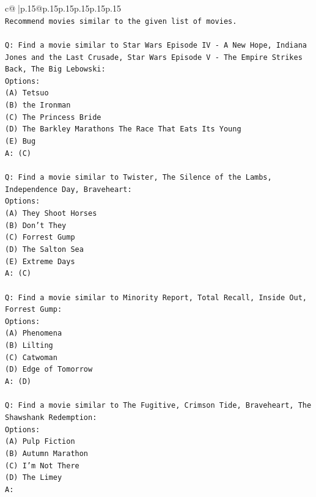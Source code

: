 \documentclass{article}
\begin{document}
{\begin{supertabular}{c@{$\;$}|p{.15\linewidth}@{}p{.15\linewidth}p{.15\linewidth}p{.15\linewidth}p{.15\linewidth}p{.15\linewidth}}
{{{\\ 
\texttt{Recommend movies similar to the given list of movies.} \\
\\ 
\texttt{Q: Find a movie similar to Star Wars Episode IV {-} A New Hope, Indiana Jones and the Last Crusade, Star Wars Episode V {-} The Empire Strikes Back, The Big Lebowski:} \\
\texttt{Options:} \\
\texttt{(A) Tetsuo} \\
\texttt{(B) the Ironman} \\
\texttt{(C) The Princess Bride} \\
\texttt{(D) The Barkley Marathons The Race That Eats Its Young} \\
\texttt{(E) Bug} \\
\texttt{A: (C)} \\
\\ 
\texttt{Q: Find a movie similar to Twister, The Silence of the Lambs, Independence Day, Braveheart:} \\
\texttt{Options:} \\
\texttt{(A) They Shoot Horses} \\
\texttt{(B) Don't They} \\
\texttt{(C) Forrest Gump} \\
\texttt{(D) The Salton Sea} \\
\texttt{(E) Extreme Days} \\
\texttt{A: (C)} \\
\\ 
\texttt{Q: Find a movie similar to Minority Report, Total Recall, Inside Out, Forrest Gump:} \\
\texttt{Options:} \\
\texttt{(A) Phenomena} \\
\texttt{(B) Lilting} \\
\texttt{(C) Catwoman} \\
\texttt{(D) Edge of Tomorrow} \\
\texttt{A: (D)} \\
\\ 
\texttt{Q: Find a movie similar to The Fugitive, Crimson Tide, Braveheart, The Shawshank Redemption:} \\
\texttt{Options:} \\
\texttt{(A) Pulp Fiction} \\
\texttt{(B) Autumn Marathon} \\
\texttt{(C) I'm Not There} \\
\texttt{(D) The Limey} \\
\texttt{A:} \\
            }
        }
    }
     \\ \\


\end{supertabular}}
\end{document}
